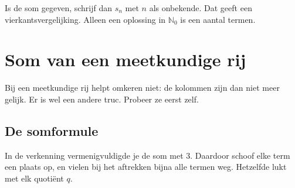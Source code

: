 \begin{werkwijze}
Is de som gegeven, schrijf dan $s_n$ met $n$ als onbekende. Dat geeft een vierkantsvergelijking. Alleen een oplossing in $\mathbb{N}_0$ is een aantal termen.
\end{werkwijze}


\begin{oefeningen}
\end{oefeningen}

\section{Som van een meetkundige rij}

Bij een meetkundige rij helpt omkeren niet: de kolommen zijn dan niet meer gelijk. Er is wel een andere truc. Probeer ze eerst zelf.

\begin{oefeningen}
\end{oefeningen}


\subsection{De somformule}

In de verkenning vermenigvuldigde je de som met 3. Daardoor schoof elke term een plaats op, en vielen bij het aftrekken bijna alle termen weg. Hetzelfde lukt met elk quotiënt $q$.

